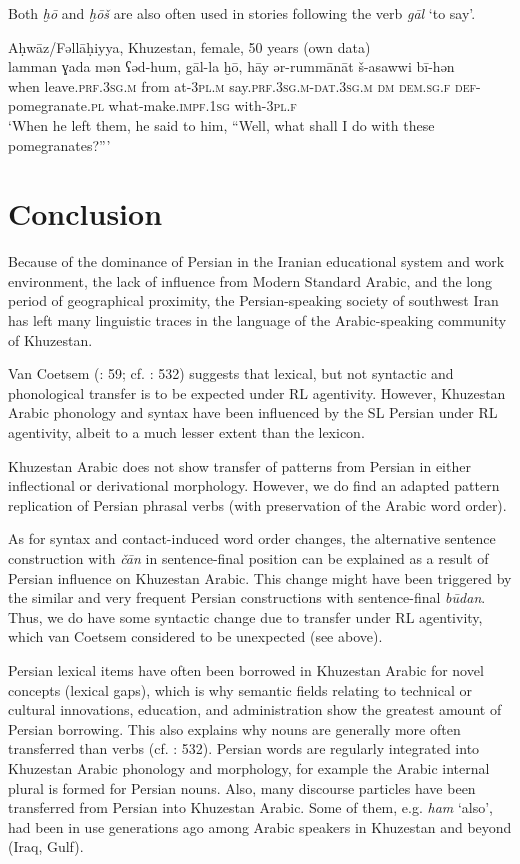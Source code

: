 \documentclass[output=paper,nonflat]{langsci/langscibook}
\begin{document}
Both \textit{ḫō} and \textit{ḫōš} are also often used in stories following the verb \textit{gāl} ‘to say’.

\ea\label{ex:key:}
{Aḥwāz/Fəllāḥiyya, Khuzestan, female, 50 years (own data)}\\
\gll lamman ɣada mən ʕəd-hum, gāl-la ḫō, hāy ər-rummānāt š-asawwi bī-hən\\
     when leave.\textsc{prf}.\textsc{3sg.m} from at-\textsc{3pl.m} say.\textsc{prf}.\textsc{3sg.m}-\textsc{dat.3sg.m} \textsc{dm} \textsc{dem}.\textsc{sg}.\textsc{f} \textsc{def}-pomegranate.\textsc{pl} what-make.\textsc{impf}.\textsc{1sg} with-\textsc{3pl.f}\\
\glt ‘When he left them, he said to him, ``Well, what shall I do with these pomegranates?”’
\z

\section{Conclusion}

Because of the dominance of Persian in the Iranian educational system and work environment, the lack of influence from Modern Standard Arabic, and the long period of geographical proximity, the Persian-speaking society of southwest Iran has left many linguistic traces in the language of the Arabic-speaking community of Khuzestan. 

Van Coetsem (\citeyear{VanCoetsem2000}: 59; cf. \citealt{Lucas2015}: 532) suggests that lexical, but not syntactic and phonological transfer is to be expected under RL agentivity. However, Khuzestan Arabic phonology and syntax have been influenced by the SL Persian under RL agentivity, albeit to a much lesser extent than the lexicon.

Khuzestan Arabic does not show transfer of patterns from Persian in either inflectional or derivational morphology. However, we do find an adapted pattern replication of Persian phrasal verbs (with preservation of the Arabic word order). 

As for syntax and contact-induced word order changes, the alternative sentence construction with \textit{čān} in sentence-final position can be explained as a result of Persian influence on Khuzestan Arabic. This change might have been triggered by the similar and very frequent Persian constructions with sentence-final \textit{būdan}. Thus, we do have some syntactic change due to transfer under RL agentivity, which van Coetsem considered to be unexpected (see above).

Persian lexical items have often been borrowed in Khuzestan Arabic for novel concepts (lexical gaps), which is why semantic fields relating to technical or cultural innovations, education, and administration show the greatest amount of Persian borrowing. This also explains why nouns are generally more often transferred than verbs (cf. \citealt{Lucas2015}: 532). Persian words are regularly integrated into Khuzestan Arabic phonology and morphology, for example the Arabic internal plural is formed for Persian nouns. Also, many discourse particles have been transferred from Persian into Khuzestan Arabic. Some of them, e.g. \textit{ham} ‘also’, had been in use generations ago among Arabic speakers in Khuzestan and beyond (Iraq, Gulf).
\end{document}
